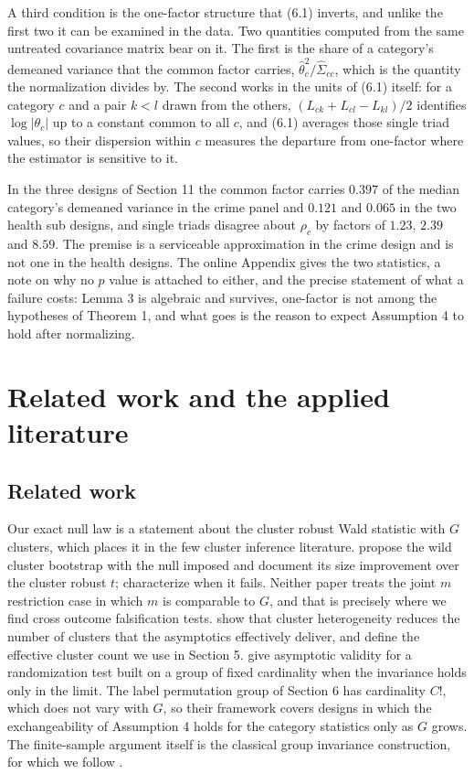 \documentclass[12pt]{article}
\theoremstyle{definition}
\numberwithin{equation}{section}
\begin{document}
A third condition is the one-factor structure that (6.1) inverts, and
unlike the first two it can be examined in the data. Two quantities computed
from the same untreated covariance matrix bear on it. The first is the share of
a category's demeaned variance that the common factor carries,
$\hat{\theta}_c^2/\hat{\Sigma}_{cc}$, which is the quantity the normalization
divides by. The second works in the units of (6.1) itself: for a
category $c$ and a pair $k < l$ drawn from the others,
$(L_{ck} + L_{cl} - L_{kl})/2$ identifies $\log|\theta_c|$ up to a constant
common to all $c$, and (6.1) averages those single triad values, so
their dispersion within $c$ measures the departure from one-factor where the
estimator is sensitive to it.

In the three designs of Section 11 the common factor carries $0.397$ of the median category's demeaned variance in the crime panel and $0.121$ and $0.065$ in the two health sub designs, and single triads disagree about $\rho_c$ by factors of $1.23$, $2.39$ and $8.59$. The premise is a serviceable approximation in the crime design and is not one in the health designs. The online Appendix gives the two statistics, a note on why no $p$ value is attached to either, and the precise statement of what a failure costs: Lemma 3 is algebraic and survives, one-factor is not among the hypotheses of Theorem 1, and what goes is the reason to expect Assumption 4 to hold after normalizing.

\section{Related work and the applied literature}

\subsection*{Related work}

Our exact null law is a statement about the cluster robust Wald statistic with
$G$ clusters, which places it in the few cluster inference literature.
\citet{cameron2008bootstrap} propose the wild cluster bootstrap with the null
imposed and document its size improvement over the cluster robust $t$;
\citet{mackinnon2017wild} characterize when it fails. Neither paper treats the
joint $m$ restriction case in which $m$ is comparable to $G$, and that is
precisely where we find cross outcome falsification tests. \citet{carter2017cluster} show that
cluster heterogeneity reduces the number of clusters that the asymptotics
effectively deliver, and define the effective cluster count we use in Section
5. \citet{canay2017randomization} give asymptotic
validity for a randomization test built on a group of fixed cardinality when
the invariance holds only in the limit. The label permutation group of Section
6 has cardinality $C!$, which does not vary with $G$, so their
framework covers designs in which the exchangeability of Assumption
4 holds for the category statistics only as $G$ grows. The
finite-sample argument itself is the classical group invariance construction,
for which we follow \citet{lehmann2005testing}.
\end{document}
